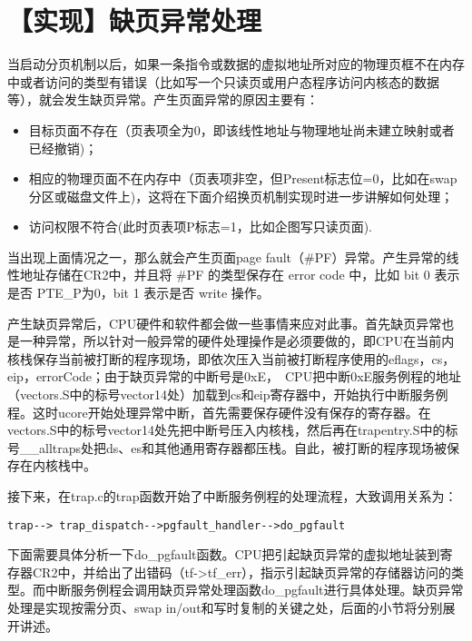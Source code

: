 \section{【实现】缺页异常处理}\label{ux5b9eux73b0ux7f3aux9875ux5f02ux5e38ux5904ux7406}

当启动分页机制以后，如果一条指令或数据的虚拟地址所对应的物理页框不在内存中或者访问的类型有错误（比如写一个只读页或用户态程序访问内核态的数据等），就会发生缺页异常。产生页面异常的原因主要有：

\begin{itemize}
\tightlist
\item
  目标页面不存在（页表项全为0，即该线性地址与物理地址尚未建立映射或者已经撤销)；
\item
  相应的物理页面不在内存中（页表项非空，但Present标志位=0，比如在swap分区或磁盘文件上)，这将在下面介绍换页机制实现时进一步讲解如何处理；
\item
  访问权限不符合(此时页表项P标志=1，比如企图写只读页面).
\end{itemize}

当出现上面情况之一，那么就会产生页面page
fault（\#PF）异常。产生异常的线性地址存储在CR2中，并且将 \#PF
的类型保存在 error code 中，比如 bit 0 表示是否 PTE\_P为0，bit 1
表示是否 write 操作。

产生缺页异常后，CPU硬件和软件都会做一些事情来应对此事。首先缺页异常也是一种异常，所以针对一般异常的硬件处理操作是必须要做的，即CPU在当前内核栈保存当前被打断的程序现场，即依次压入当前被打断程序使用的eflags，cs，eip，errorCode；由于缺页异常的中断号是0xE，~CPU把中断0xE服务例程的地址（vectors.S中的标号vector14处）加载到cs和eip寄存器中，开始执行中断服务例程。这时ucore开始处理异常中断，首先需要保存硬件没有保存的寄存器。在vectors.S中的标号vector14处先把中断号压入内核栈，然后再在trapentry.S中的标号\_\_alltraps处把ds、es和其他通用寄存器都压栈。自此，被打断的程序现场被保存在内核栈中。

接下来，在trap.c的trap函数开始了中断服务例程的处理流程，大致调用关系为：

\begin{lstlisting}
trap--> trap_dispatch-->pgfault_handler-->do_pgfault
\end{lstlisting}

下面需要具体分析一下do\_pgfault函数。CPU把引起缺页异常的虚拟地址装到寄存器CR2中，并给出了出错码（tf-\textgreater{}tf\_err），指示引起缺页异常的存储器访问的类型。而中断服务例程会调用缺页异常处理函数do\_pgfault进行具体处理。缺页异常处理是实现按需分页、swap
in/out和写时复制的关键之处，后面的小节将分别展开讲述。

